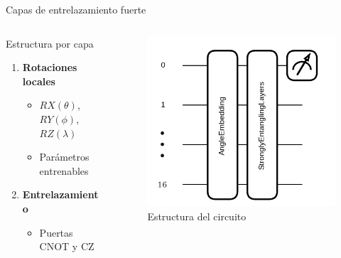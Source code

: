 \documentclass[aspectratio=169]{beamer}
\begin{document}
\begin{frame}{Capas de entrelazamiento fuerte}
  \begin{columns}
    \begin{column}{0.6\textwidth}
      \begin{block}{Estructura por capa}
        \begin{enumerate}
          \item \textbf{Rotaciones locales}
            \begin{itemize}
              \item $RX(\theta)$, $RY(\phi)$, $RZ(\lambda)$
              \item Parámetros entrenables
            \end{itemize}
          \item \textbf{Entrelazamiento}
            \begin{itemize}
              \item Puertas CNOT y CZ
            \end{itemize}
        \end{enumerate}
      \end{block}
    \end{column}
    \begin{column}{0.4\textwidth}
      \begin{figure}
        \includegraphics[width=\textwidth]{circuito.png}
        \caption{Estructura del circuito}
      \end{figure}
    \end{column}
  \end{columns}
\end{frame}
\end{document}
